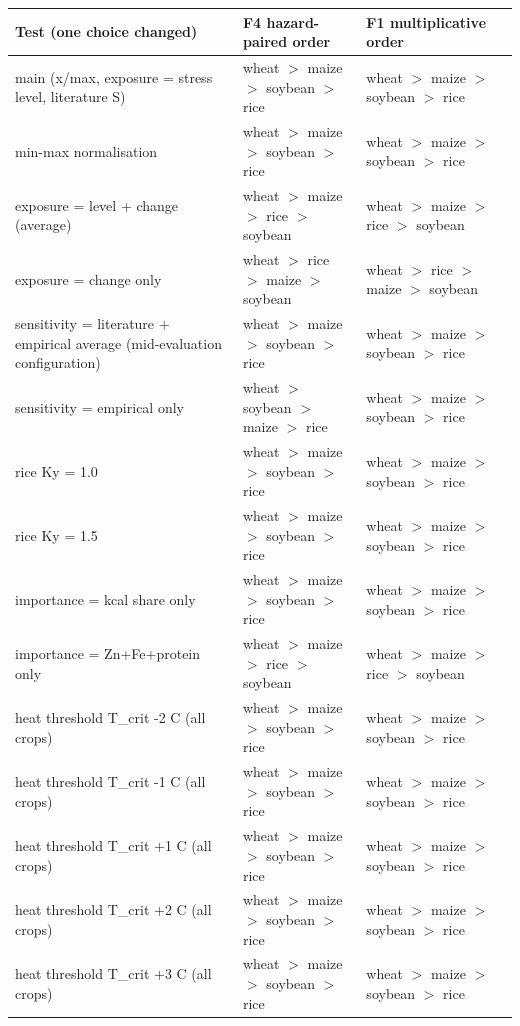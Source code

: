 \begin{tabular}{lll}
\toprule
Test (one choice changed) & F4 hazard-paired order & F1 multiplicative order\\
\midrule
main (x/max, exposure = stress level, literature S) & wheat $>$ maize $>$ soybean $>$ rice & wheat $>$ maize $>$ soybean $>$ rice \\
min-max normalisation & wheat $>$ maize $>$ soybean $>$ rice & wheat $>$ maize $>$ soybean $>$ rice \\
exposure = level + change (average) & wheat $>$ maize $>$ rice $>$ soybean & wheat $>$ maize $>$ rice $>$ soybean \\
exposure = change only & wheat $>$ rice $>$ maize $>$ soybean & wheat $>$ rice $>$ maize $>$ soybean \\
sensitivity = literature + empirical average (mid-evaluation configuration) & wheat $>$ maize $>$ soybean $>$ rice & wheat $>$ maize $>$ soybean $>$ rice \\
sensitivity = empirical only & wheat $>$ soybean $>$ maize $>$ rice & wheat $>$ maize $>$ soybean $>$ rice \\
rice Ky = 1.0 & wheat $>$ maize $>$ soybean $>$ rice & wheat $>$ maize $>$ soybean $>$ rice \\
rice Ky = 1.5 & wheat $>$ maize $>$ soybean $>$ rice & wheat $>$ maize $>$ soybean $>$ rice \\
importance = kcal share only & wheat $>$ maize $>$ soybean $>$ rice & wheat $>$ maize $>$ soybean $>$ rice \\
importance = Zn+Fe+protein only & wheat $>$ maize $>$ rice $>$ soybean & wheat $>$ maize $>$ rice $>$ soybean \\
heat threshold T\_crit -2 C (all crops) & wheat $>$ maize $>$ soybean $>$ rice & wheat $>$ maize $>$ soybean $>$ rice \\
heat threshold T\_crit -1 C (all crops) & wheat $>$ maize $>$ soybean $>$ rice & wheat $>$ maize $>$ soybean $>$ rice \\
heat threshold T\_crit +1 C (all crops) & wheat $>$ maize $>$ soybean $>$ rice & wheat $>$ maize $>$ soybean $>$ rice \\
heat threshold T\_crit +2 C (all crops) & wheat $>$ maize $>$ soybean $>$ rice & wheat $>$ maize $>$ soybean $>$ rice \\
heat threshold T\_crit +3 C (all crops) & wheat $>$ maize $>$ soybean $>$ rice & wheat $>$ maize $>$ soybean $>$ rice \\
\bottomrule
\end{tabular}

